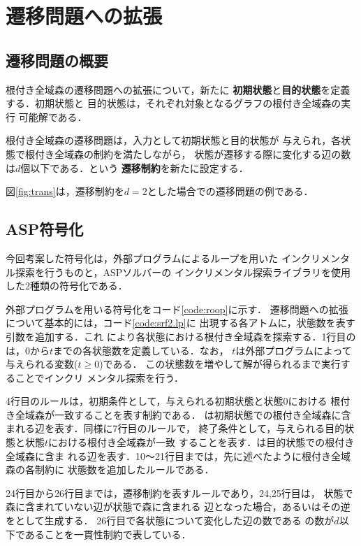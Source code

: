 \section{遷移問題への拡張}

\subsection{遷移問題の概要}

根付き全域森の遷移問題への拡張について，新たに
\textbf{初期状態}と\textbf{目的状態}を定義する．初期状態と
目的状態は，それぞれ対象となるグラフの根付き全域森の実行
可能解である．

根付き全域森の遷移問題は，入力として初期状態と目的状態が
与えられ，各状態で根付き全域森の制約を満たしながら，
状態が遷移する際に変化する辺の数は$d$個以下である．という
\textbf{遷移制約}を新たに設定する．

図\ref{fig:trans}は，遷移制約を$d=2$とした場合での遷移問題の例である．

\subsection{ASP符号化}
今回考案した符号化は，外部プログラムによるループを用いた
インクリメンタル探索を行うものと，ASPソルバー{\clingo}の
インクリメンタル探索ライブラリを使用した2種類の符号化である．

外部プログラムを用いる符号化をコード\ref{code:roop}に示す．
遷移問題への拡張について基本的には，コード\ref{code:srf2.lp}に
出現する各アトムに，状態数を表す引数を追加する．これ
により各状態における根付き全域森を探索する．1行目の
は，0から$t$までの各状態数を定義している．なお，
$t$は外部プログラムによって与えられる変数($t \geq 0$)である．
この状態数を増やして解が得られるまで実行することでインクリ
メンタル探索を行う．

4行目のルールは，初期条件として，与えられる初期状態と状態0における
根付き全域森が一致することを表す制約である．
は初期状態での根付き全域森に含まれる辺を表す．同様に7行目のルールで，
終了条件として，与えられる目的状態と状態$t$における根付き全域森が一致
することを表す．は目的状態での根付き全域森に含ま
れる辺を表す．10〜21行目までは，先に述べたように根付き全域森の各制約に
状態数を追加したルールである．

24行目から26行目までは，遷移制約を表すルールであり，24,25行目は，
状態で森に含まれていない辺が状態で森に含まれる
辺となった場合，あるいはその逆をとして生成する．
26行目で各状態について変化した辺の数である
の数が$d$以下であることを一貫性制約で表している．

